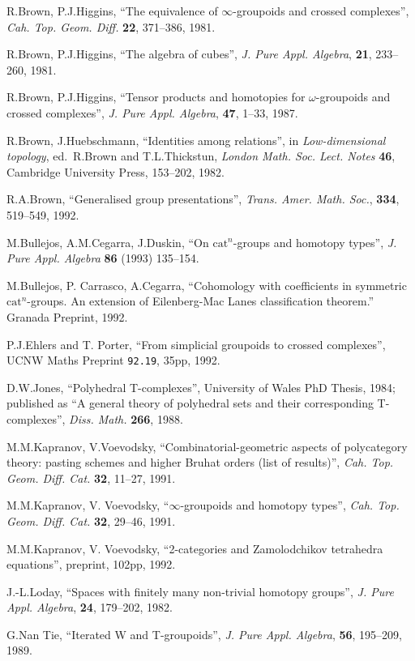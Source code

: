 \documentclass{article}
\begin{document}
\begin{enumerate}
  R.Brown, P.J.Higgins, ``The equivalence of \(\infty\)-groupoids and
  crossed complexes'', \emph{Cah. Top. Geom. Diff.} \textbf{22},
  371--386, 1981.

  R.Brown, P.J.Higgins, ``The algebra of cubes'', \emph{J. Pure Appl.
  Algebra}, \textbf{21}, 233--260, 1981.

  R.Brown, P.J.Higgins, ``Tensor products and homotopies for
  \(\omega\)-groupoids and crossed complexes'', \emph{J. Pure Appl.
  Algebra}, \textbf{47}, 1--33, 1987.

  R.Brown, J.Huebschmann, ``Identities among relations'', in
  \emph{Low-dimensional topology}, ed.~R.Brown and T.L.Thickstun,
  \emph{London Math. Soc. Lect. Notes} \textbf{46}, Cambridge University
  Press, 153--202, 1982.

  R.A.Brown, ``Generalised group presentations'', \emph{Trans. Amer.
  Math. Soc.}, \textbf{334}, 519--549, 1992.

  M.Bullejos, A.M.Cegarra, J.Duskin, ``On \(\mathrm{cat}^n\)-groups and
  homotopy types'', \emph{J. Pure Appl. Algebra} \textbf{86} (1993)
  135--154.

  M.Bullejos, P. Carrasco, A.Cegarra, ``Cohomology with coefficients in
  symmetric \(\mathrm{cat}^n\)-groups. An extension of Eilenberg-Mac
  Lanes classification theorem.'' Granada Preprint, 1992.

  P.J.Ehlers and T. Porter, ``From simplicial groupoids to crossed
  complexes'', UCNW Maths Preprint \texttt{92.19}, 35pp, 1992.

  D.W.Jones, ``Polyhedral T-complexes'', University of Wales PhD Thesis,
  1984; published as ``A general theory of polyhedral sets and their
  corresponding T-complexes'', \emph{Diss. Math.} \textbf{266}, 1988.

  M.M.Kapranov, V.Voevodsky, ``Combinatorial-geometric aspects of
  polycategory theory: pasting schemes and higher Bruhat orders (list of
  results)'', \emph{Cah. Top. Geom. Diff. Cat.} \textbf{32}, 11--27,
  1991.

  M.M.Kapranov, V. Voevodsky, ``\(\infty\)-groupoids and homotopy
  types'', \emph{Cah. Top. Geom. Diff. Cat.} \textbf{32}, 29--46, 1991.

  M.M.Kapranov, V. Voevodsky, ``2-categories and Zamolodchikov
  tetrahedra equations'', preprint, 102pp, 1992.

  J.-L.Loday, ``Spaces with finitely many non-trivial homotopy groups'',
  \emph{J. Pure Appl. Algebra}, \textbf{24}, 179--202, 1982.

  G.Nan Tie, ``Iterated W and T-groupoids'', \emph{J. Pure Appl.
  Algebra}, \textbf{56}, 195--209, 1989.


\end{enumerate}
\end{document}
